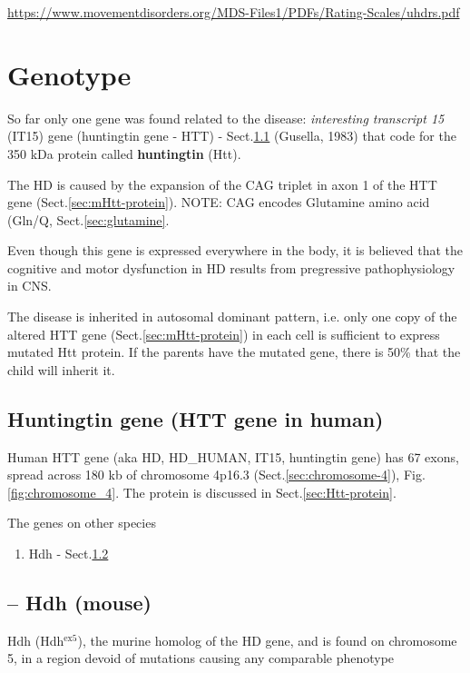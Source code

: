 \url{https://www.movementdisorders.org/MDS-Files1/PDFs/Rating-Scales/uhdrs.pdf}




\section{Genotype}
\label{sec:genetics_Huntington}

So far only one gene was found related to the disease: {\it interesting
transcript 15} (IT15) gene (huntingtin gene - HTT) - Sect.\ref{sec:HTT_gene}
(Gusella, 1983) that code for the 350 kDa protein called {\bf huntingtin} (Htt).

The HD is caused by the expansion of the CAG triplet in axon 1 of the HTT gene
(Sect.\ref{sec:mHtt-protein}). NOTE: CAG encodes Glutamine amino acid (Gln/Q,
Sect.\ref{sec:glutamine}.

Even though this gene is expressed everywhere in
the body, it is believed that the cognitive and motor dysfunction in HD results
from pregressive pathophysiology in CNS.


The disease is inherited in autosomal dominant pattern, i.e. only one copy of
the altered HTT gene (Sect.\ref{sec:mHtt-protein}) in each cell is sufficient to
express mutated Htt protein. If the parents have the mutated gene, there is 50\%
that the child will inherit it.

\subsection{Huntingtin gene (HTT gene in human)}
\label{sec:HTT_gene}

Human HTT gene (aka HD, HD\_HUMAN, IT15, huntingtin gene) has 67 exons,
spread across 180 kb of chromosome 4p16.3 (Sect.\ref{sec:chromosome-4}),
Fig.\ref{fig:chromosome_4}. The protein is discussed in
Sect.\ref{sec:Htt-protein}. 

The genes on other species
\begin{enumerate}
  \item Hdh - Sect.\ref{sec:HTT-gene-Hdh-mouse}
\end{enumerate}

\subsection{-- Hdh (mouse)}
\label{sec:HTT-gene-Hdh-mouse}

Hdh (Hdh$^{\text{ex5}}$), the murine homolog of the HD gene, and is found on
chromosome 5, in a region devoid of mutations causing any comparable phenotype

